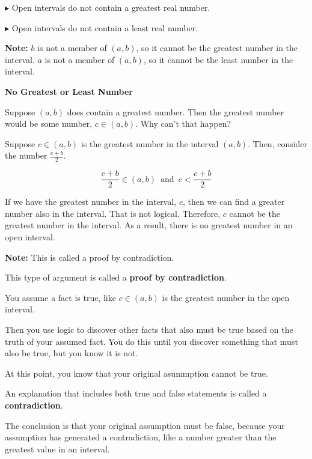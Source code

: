\documentclass{ximera}
\begin{document}
$\blacktriangleright$ Open intervals do not contain a greatest real number.

$\blacktriangleright$ Open intervals do not contain a least real number.

\textbf{Note:} $b$ is not a member of $(a,b)$, so it cannot be the greatest number in the interval.    $a$ is not a member of $(a,b)$, so it cannot be the least number in the interval.   


\begin{explanation} \textbf{\textcolor{red!75!green}{No Greatest or Least Number}} 

Suppose $(a,b)$ does contain a greatest number. Then the greatest number would be some number, $c \in (a,b)$.  Why can't that happen?  


Suppose $c \in (a,b)$ is the greatest number in the interval $(a,b)$.  Then, consider the number  $\frac{c+b}{2}$.   

\[  \frac{c+b}{2} \in (a,b)  \, \text{ and } \,  c < \frac{c+b}{2} \]  


If we have the greatest number in the interval, $c$, then we can find a greater number also in the interval. That is not logical. Therefore, $c$ cannot be the greatest number in the interval.  As a result, there is no greatest number in an open interval. 


\textbf{Note:} This is called a proof by contradiction.

\end{explanation}





\begin{paradox}

This type of argument is called a \textbf{proof by contradiction}.   

You assume a fact is true, like $c \in (a,b)$ is the greatest number in the open interval.  

Then you use logic to discover other facts that also must be true based on the truth of your assumed fact.  You do this until you discover something that must also be true, but you know it is not. 

At this point, you know that your original asummption cannot be true. 

An explanation that includes both true and false statements is called a \textbf{contradiction}. 

The conclusion is that your original assumption must be false, because your assumption has generated a contradiction, like a number greater than the greatest value in an interval.


\end{paradox}
\end{document}
